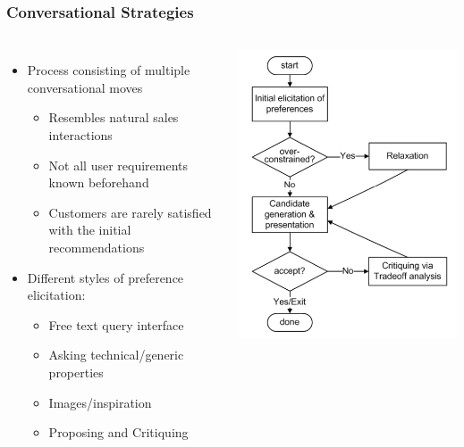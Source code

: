 \documentclass{beamer}
\begin{document}
\begin{frame}
    \frametitle{Conversational Strategies}
    \footnotesize
    \begin{columns}
        \begin{itemize}
        \item Process consisting of multiple conversational moves
            \begin{itemize}
                \footnotesize
            \item Resembles natural sales interactions
            \item Not all user requirements known beforehand
            \item Customers are rarely satisfied with the initial
                recommendations
            \end{itemize}
        \item Different styles of preference elicitation:
            \begin{itemize}
                \footnotesize
            \item Free text query interface
            \item Asking technical/generic properties
            \item Images/inspiration
            \item Proposing and Critiquing
            \end{itemize}
        \end{itemize}
        \centering\includegraphics[width=\linewidth]{dialogue}
    \end{columns}
\end{frame}
\end{document}
